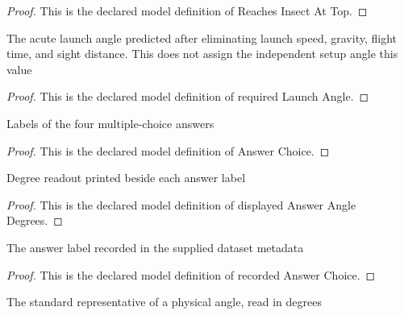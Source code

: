 \begin{proof}
  This is the declared model definition of Reaches Insect At Top.
\end{proof}
\begin{definition}
  \label{def:physics:phyx-mini-0742:phyxminiproblems-problemphyxmini0742-requiredlaunchangle}
  The acute launch angle predicted after eliminating launch speed, gravity, flight time, and sight distance. This does not assign the independent setup angle this value
\end{definition}
\begin{proof}
  This is the declared model definition of required Launch Angle.
\end{proof}
\begin{definition}
  \label{def:physics:phyx-mini-0742:phyxminiproblems-problemphyxmini0742-answerchoice}
  Labels of the four multiple-choice answers
\end{definition}
\begin{proof}
  This is the declared model definition of Answer Choice.
\end{proof}
\begin{definition}
  \label{def:physics:phyx-mini-0742:phyxminiproblems-problemphyxmini0742-displayedanswerangledegrees}
  Degree readout printed beside each answer label
\end{definition}
\begin{proof}
  This is the declared model definition of displayed Answer Angle Degrees.
\end{proof}
\begin{definition}
  \label{def:physics:phyx-mini-0742:phyxminiproblems-problemphyxmini0742-recordedanswerchoice}
  The answer label recorded in the supplied dataset metadata
\end{definition}
\begin{proof}
  This is the declared model definition of recorded Answer Choice.
\end{proof}
\begin{definition}
  \label{def:physics:phyx-mini-0742:phyxminiproblems-problemphyxmini0742-angleindegrees}
  The standard representative of a physical angle, read in degrees
\end{definition}
